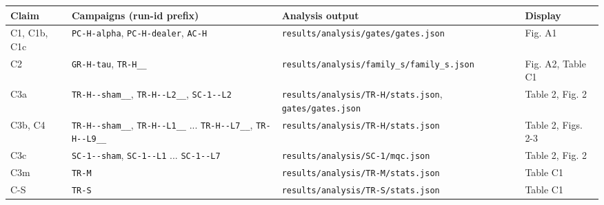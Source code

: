 \documentclass[11pt,a4paper]{article}
\begin{document}
\begin{center}
\footnotesize
\setlength{\tabcolsep}{3pt}
%
\begin{tabularx}{\linewidth}{@{}LLLL@{}}
\toprule
Claim & Campaigns (run-id prefix) & Analysis output & Display \\
\midrule
C1, C1b, C1c & \texttt{PC-\allowbreak{}H-\allowbreak{}alpha}, \texttt{PC-\allowbreak{}H-\allowbreak{}dealer}, \texttt{AC-\allowbreak{}H} & \texttt{results/\allowbreak{}analysis/\allowbreak{}gates/\allowbreak{}gates.\allowbreak{}json} & Fig. A1 \\
C2 & \texttt{GR-\allowbreak{}H-\allowbreak{}tau}, \texttt{TR-\allowbreak{}H\_\allowbreak{}\_\allowbreak{}} & \texttt{results/\allowbreak{}analysis/\allowbreak{}family\_\allowbreak{}s/\allowbreak{}family\_\allowbreak{}s.\allowbreak{}json} & Fig. A2, Table C1 \\
C3a & \texttt{TR-\allowbreak{}H-\allowbreak{}-\allowbreak{}sham\_\allowbreak{}\_\allowbreak{}}, \texttt{TR-\allowbreak{}H-\allowbreak{}-\allowbreak{}L2\_\allowbreak{}\_\allowbreak{}}, \texttt{SC-\allowbreak{}1-\allowbreak{}-\allowbreak{}L2} & \texttt{results/\allowbreak{}analysis/\allowbreak{}TR-\allowbreak{}H/\allowbreak{}stats.\allowbreak{}json}, \texttt{gates/\allowbreak{}gates.\allowbreak{}json} & Table 2, Fig. 2 \\
C3b, C4 & \texttt{TR-\allowbreak{}H-\allowbreak{}-\allowbreak{}sham\_\allowbreak{}\_\allowbreak{}}, \texttt{TR-\allowbreak{}H-\allowbreak{}-\allowbreak{}L1\_\allowbreak{}\_\allowbreak{}} ... \texttt{TR-\allowbreak{}H-\allowbreak{}-\allowbreak{}L7\_\allowbreak{}\_\allowbreak{}}, \texttt{TR-\allowbreak{}H-\allowbreak{}-\allowbreak{}L9\_\allowbreak{}\_\allowbreak{}} & \texttt{results/\allowbreak{}analysis/\allowbreak{}TR-\allowbreak{}H/\allowbreak{}stats.\allowbreak{}json} & Table 2, Figs. 2-3 \\
C3c & \texttt{SC-\allowbreak{}1-\allowbreak{}-\allowbreak{}sham}, \texttt{SC-\allowbreak{}1-\allowbreak{}-\allowbreak{}L1} ... \texttt{SC-\allowbreak{}1-\allowbreak{}-\allowbreak{}L7} & \texttt{results/\allowbreak{}analysis/\allowbreak{}SC-\allowbreak{}1/\allowbreak{}mqc.\allowbreak{}json} & Table 2, Fig. 2 \\
C3m & \texttt{TR-\allowbreak{}M} & \texttt{results/\allowbreak{}analysis/\allowbreak{}TR-\allowbreak{}M/\allowbreak{}stats.\allowbreak{}json} & Table C1 \\
C-S & \texttt{TR-\allowbreak{}S} & \texttt{results/\allowbreak{}analysis/\allowbreak{}TR-\allowbreak{}S/\allowbreak{}stats.\allowbreak{}json} & Table C1 \\

\end{tabularx}
\end{center}
\end{document}
